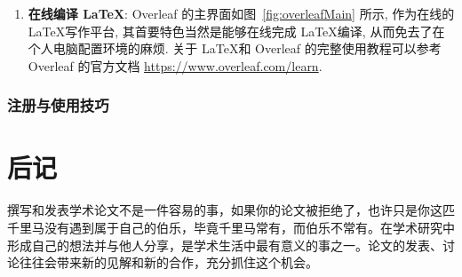 \documentclass{formatBook}
\begin{document}
\begin{enumerate}
    \item \textbf{在线编译 \LaTeX }: Overleaf 的主界面如图~\ref{fig:overleafMain} 所示, 作为在线的 \LaTeX 写作平台, 其首要特色当然是能够在线完成 \LaTeX 编译, 从而免去了在个人电脑配置环境的麻烦. 关于 \LaTeX 和 Overleaf 的完整使用教程可以参考 Overleaf 的官方文档 \url{https://www.overleaf.com/learn}.
\end{enumerate}

\subsection{注册与使用技巧}
% 
\chapter{后记}
撰写和发表学术论文不是一件容易的事，如果你的论文被拒绝了，也许只是你这匹千里马没有遇到属于自己的伯乐，毕竟千里马常有，而伯乐不常有。在学术研究中形成自己的想法并与他人分享，是学术生活中最有意义的事之一。论文的发表、讨论往往会带来新的见解和新的合作，充分抓住这个机会。


\end{document}
